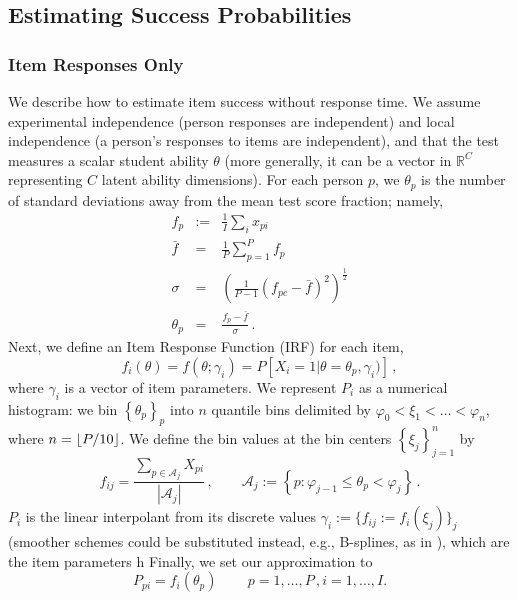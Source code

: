 \documentclass{article}
\DeclarePairedDelimiter\floor{\lfloor}{\rfloor}
\newcommand{\cA}{\mathcal{A}}
\newcommand{\ta}{\theta}
\newcommand{\R}{\mathbb{R}}
\begin{document}
\subsection{Estimating Success Probabilities}
\label{ability_estimation}

\subsubsection{Item Responses Only}
We describe how to estimate item success without response time. We assume experimental independence (person responses are independent) and local independence (a person's responses to items are independent), and that the test measures a scalar student ability $\theta$ (more generally, it can be a vector in $\R^C$ representing $C$ latent ability dimensions). For each person $p$, we $\theta_p$ is the number of standard deviations away from the mean test score fraction; namely,
\begin{eqnarray}
	f_{p} &:=& \frac{1}{I} \sum_i x_{pi} \\
	\bar{f} &=& \frac{1}{P} \sum_{p=1}^{P} f_{p} \\
	\sigma &=& \left(\frac{1}{P-1} (f_{pc} - \bar{f})^2 \right)^{\frac12} \\
	\theta_{p} &=& \frac{f_{p} - \bar{f}}{\sigma}\,.
	\label{theta_init}
\end{eqnarray}
Next, we define an Item Response Function (IRF) for each item,
\begin{equation}
  f_i(\theta) = f(\theta; \gamma_i) = P \left[X_i=1 | \theta=\theta_p, \gamma_i) \right]\,,
\end{equation}
where $\gamma_i$ is a vector of item parameters. We represent $P_i$ as a numerical histogram: we bin $\left\{\theta_p\right\}_p$ into $n$ quantile bins delimited by $\varphi_0 < \xi_1 < \dots < \varphi_n$, where $n = \floor*{P / 10}$. We define the bin values at the bin centers $\left\{\xi_j \right\}_{j=1}^n$ by
\begin{equation}
	\label{histogram_const}
	f_{ij} = \frac{\sum_{p \in \cA_j} X_{pi}}{|\cA_j|}\,,\qquad
	\cA_j := \left\{ p : \varphi_{j-1} \leq \ta_p < \varphi_j \right\}\,.
\end{equation}
$P_i$ is the linear interpolant from its discrete values $\gamma_i := \{f_{ij} := f_i(\xi_j)\}_j$ (smoother schemes could be substituted instead, e.g., B-splines, as in \cite{matt_bsplines}), which are the item parameters h Finally, we set our approximation to
\begin{equation}
	P_{pi} = f_i(\theta_p)\qquad\, p=1,\dots,P\,,i=1,\dots,I.
	\label{ppi_interpolation}
\end{equation}
\end{document}
